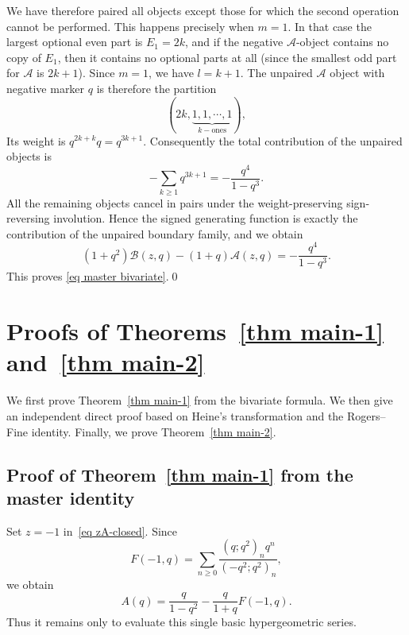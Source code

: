 \documentclass[10pt,a4paper]{amsart}
\numberwithin{equation}{section}
\newcommand{\fr}{\frac}
\begin{document}
We have therefore paired all objects except those for which the second
operation cannot be performed.  This happens precisely when \(m=1\).  In that
case the largest optional even part is \(E_1=2k\), and if the negative \(\mathcal A\)-object contains no copy of \(E_1\), then it contains no optional parts at all (since the smallest odd part for $\mathcal A$ is $2k+1$).  Since \(m=1\), we have \(l=k+1\).  The unpaired $\mathcal{A}$ object with negative marker $q$ is therefore
the partition
\[
(2k,\underbrace{1,1,\cdots,1}_{k-\text{ones}}),
\]
Its weight is $q^{2k+k}q=q^{3k+1}$. Consequently the total contribution of the unpaired objects is
\[
-\sum_{k\ge1}q^{3k+1}
=
-\frac{q^4}{1-q^3}.
\]
All the remaining objects cancel in pairs under the weight-preserving
sign-reversing involution.  Hence the signed generating function is exactly
the contribution of the unpaired boundary family, and we obtain
\[
(1+q^2)\mathcal B(z,q)-(1+q)\mathcal A(z,q)
=
-\frac{q^4}{1-q^3}.
\]
This proves \eqref{eq master bivariate}.\qed




\section{Proofs of Theorems~\ref{thm main-1} and~\ref{thm main-2}}\label{sec proofs main theorems}
%
We first prove Theorem~\ref{thm main-1} from the bivariate formula.  We then give an independent direct proof based on Heine's transformation and the Rogers--Fine identity.  Finally, we prove Theorem~\ref{thm main-2}.

\subsection{Proof of Theorem~\ref{thm main-1} from the master identity}\label{sec proof main-1}
%
Set $z=-1$ in~\eqref{eq zA-closed}. Since
\[
F(-1,q)=\sum_{n\geq 0}\fr{(q;q^2)_n q^n}{(-q^2;q^2)_n},
\]
we obtain
\begin{equation}\label{eq A-from-F}
A(q)=\fr{q}{1-q^2}-\fr{q}{1+q}F(-1,q).
\end{equation}
Thus it remains only to evaluate this single basic hypergeometric series.
\end{document}
